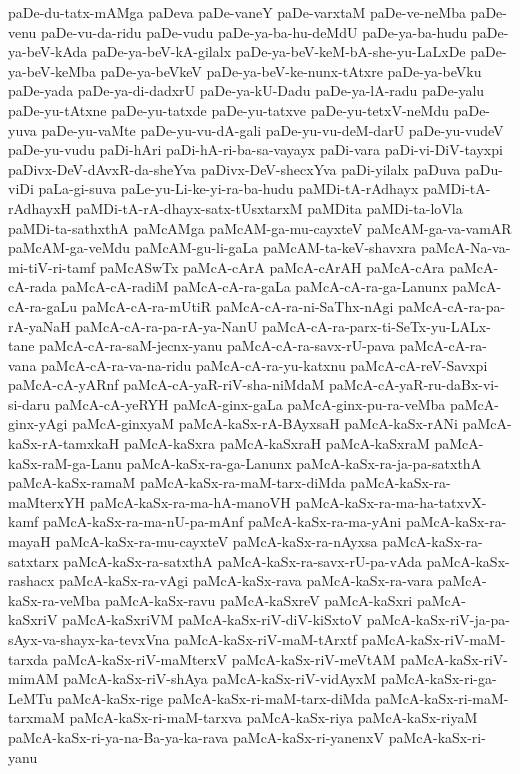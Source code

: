 {paDe-du-tatx-mAMga
paDeva
paDe-vaneY
paDe-varxtaM
paDe-ve-neMba
paDe-venu
paDe-vu-da-ridu
paDe-vudu
paDe-ya-ba-hu-deMdU
paDe-ya-ba-hudu
paDe-ya-beV-kAda
paDe-ya-beV-kA-gilalx
paDe-ya-beV-keM-bA-she-yu-LaLxDe
paDe-ya-beV-keMba
paDe-ya-beVkeV
paDe-ya-beV-ke-nunx-tAtxre
paDe-ya-beVku
paDe-yada
paDe-ya-di-dadxrU
paDe-ya-kU-Dadu
paDe-ya-lA-radu
paDe-yalu
paDe-yu-tAtxne
paDe-yu-tatxde
paDe-yu-tatxve
paDe-yu-tetxV-neMdu
paDe-yuva
paDe-yu-vaMte
paDe-yu-vu-dA-gali
paDe-yu-vu-deM-darU
paDe-yu-vudeV
paDe-yu-vudu
paDi-hAri
paDi-hA-ri-ba-sa-vayayx
paDi-vara
paDi-vi-DiV-tayxpi
paDivx-DeV-dAvxR-da-sheYva
paDivx-DeV-shecxYva
paDi-yilalx
paDuva
paDu-viDi
paLa-gi-suva
paLe-yu-Li-ke-yi-ra-ba-hudu
paMDi-tA-rAdhayx
paMDi-tA-rAdhayxH
paMDi-tA-rA-dhayx-satx-tUsxtarxM
paMDita
paMDi-ta-loVla
paMDi-ta-sathxthA
paMcAMga
paMcAM-ga-mu-cayxteV
paMcAM-ga-va-vamAR
paMcAM-ga-veMdu
paMcAM-gu-li-gaLa
paMcAM-ta-keV-shavxra
paMcA-Na-va-mi-tiV-ri-tamf
paMcASwTx
paMcA-cArA
paMcA-cArAH
paMcA-cAra
paMcA-cA-rada
paMcA-cA-radiM
paMcA-cA-ra-gaLa
paMcA-cA-ra-ga-Lanunx
paMcA-cA-ra-gaLu
paMcA-cA-ra-mUtiR
paMcA-cA-ra-ni-SaThx-nAgi
paMcA-cA-ra-pa-rA-yaNaH
paMcA-cA-ra-pa-rA-ya-NanU
paMcA-cA-ra-parx-ti-SeTx-yu-LALx-tane
paMcA-cA-ra-saM-jecnx-yanu
paMcA-cA-ra-savx-rU-pava
paMcA-cA-ra-vana
paMcA-cA-ra-va-na-ridu
paMcA-cA-ra-yu-katxnu
paMcA-cA-reV-Savxpi
paMcA-cA-yARnf
paMcA-cA-yaR-riV-sha-niMdaM
paMcA-cA-yaR-ru-daBx-vi-si-daru
paMcA-cA-yeRYH
paMcA-ginx-gaLa
paMcA-ginx-pu-ra-veMba
paMcA-ginx-yAgi
paMcA-ginxyaM
paMcA-kaSx-rA-BAyxsaH
paMcA-kaSx-rANi
paMcA-kaSx-rA-tamxkaH
paMcA-kaSxra
paMcA-kaSxraH
paMcA-kaSxraM
paMcA-kaSx-raM-ga-Lanu
paMcA-kaSx-ra-ga-Lanunx
paMcA-kaSx-ra-ja-pa-satxthA
paMcA-kaSx-ramaM
paMcA-kaSx-ra-maM-tarx-diMda
paMcA-kaSx-ra-maMterxYH
paMcA-kaSx-ra-ma-hA-manoVH
paMcA-kaSx-ra-ma-ha-tatxvX-kamf
paMcA-kaSx-ra-ma-nU-pa-mAnf
paMcA-kaSx-ra-ma-yAni
paMcA-kaSx-ra-mayaH
paMcA-kaSx-ra-mu-cayxteV
paMcA-kaSx-ra-nAyxsa
paMcA-kaSx-ra-satxtarx
paMcA-kaSx-ra-satxthA
paMcA-kaSx-ra-savx-rU-pa-vAda
paMcA-kaSx-rashacx
paMcA-kaSx-ra-vAgi
paMcA-kaSx-rava
paMcA-kaSx-ra-vara
paMcA-kaSx-ra-veMba
paMcA-kaSx-ravu
paMcA-kaSxreV
paMcA-kaSxri
paMcA-kaSxriV
paMcA-kaSxriVM
paMcA-kaSx-riV-diV-kiSxtoV
paMcA-kaSx-riV-ja-pa-sAyx-va-shayx-ka-tevxVna
paMcA-kaSx-riV-maM-tArxtf
paMcA-kaSx-riV-maM-tarxda
paMcA-kaSx-riV-maMterxV
paMcA-kaSx-riV-meVtAM
paMcA-kaSx-riV-mimAM
paMcA-kaSx-riV-shAya
paMcA-kaSx-riV-vidAyxM
paMcA-kaSx-ri-ga-LeMTu
paMcA-kaSx-rige
paMcA-kaSx-ri-maM-tarx-diMda
paMcA-kaSx-ri-maM-tarxmaM
paMcA-kaSx-ri-maM-tarxva
paMcA-kaSx-riya
paMcA-kaSx-riyaM
paMcA-kaSx-ri-ya-na-Ba-ya-ka-rava
paMcA-kaSx-ri-yanenxV
paMcA-kaSx-ri-yanu
}
